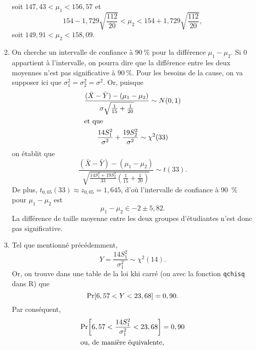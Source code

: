 \begin{solution}{5.5}
\begin{enumerate}
      soit $147,43 < \mu_1 < 156,57$ et
      \begin{equation*}
        154 - 1,729 \sqrt{\frac{112}{20}} < \mu_2 <
        154 + 1,729 \sqrt{\frac{112}{20}},
      \end{equation*}
      soit $149,91 < \mu_2 < 158,09$.
    \item On cherche un intervalle de confiance à $90~\%$ pour la
      différence $\mu_1 - \mu_2$. Si $0$ appartient à l'intervalle, on
      pourra dire que la différence entre les deux moyennes n'est pas
      significative à $90~\%$. Pour les besoins de la cause, on va
      supposer ici que $\sigma_1^2 = \sigma_2^2 = \sigma^2$. Or,
      puisque
      \begin{gather*}
        \frac{(\bar{X} - \bar{Y}) - (\mu_1 - \mu_2)}{%
          \sigma \sqrt{\frac{1}{15} + \frac{1}{20}}}
        \sim N(0, 1) \\
        \intertext{et que}
        \frac{14 S_1^2}{\sigma^2} + \frac{19 S_2^2}{\sigma^2}
        \sim \chi^2(33)
      \end{gather*}
      on établit que
      \begin{displaymath}
        \frac{(\bar{X} - \bar{Y}) - (\mu_1 - \mu_2)}{\sqrt{\frac{14
              S_1^2 + 19 S_2^2}{33} \left( \frac{1}{15} + \frac{1}{20}
            \right)}} \sim t(33).
      \end{displaymath}
      De plus, $t_{0,05}(33) \approx z_{0,05} = 1,645$, d'où
      l'intervalle de confiance à 90~\% pour $\mu_1 - \mu_2$ est
      \begin{displaymath}
        \mu_1 - \mu_2 \in -2 \pm 5,82.
      \end{displaymath}
      La différence de taille moyenne entre les deux groupes
      d'étudiantes n'est donc pas significative.
    \item Tel que mentionné précédemment,
      \begin{displaymath}
        Y = \frac{14 S_1^2}{\sigma_1^2} \sim \chi^2(14).
      \end{displaymath}
      Or, on trouve dans une table de la loi khi carré (ou avec la
      fonction \texttt{qchisq} dans \textsf{R}) que
      \begin{displaymath}
        \mathrm{Pr}\! \left[ 6,57 < Y < 23,68 \right] = 0,90.
      \end{displaymath}
      Par conséquent,
      \begin{gather*}
        \Prob{
          6,57 < \frac{14 S_1^2}{\sigma_1^2} < 23,68
        } = 0,90 \\
        \intertext{ou, de manière équivalente,}

\end{gather*}
\end{enumerate}
\end{solution}
